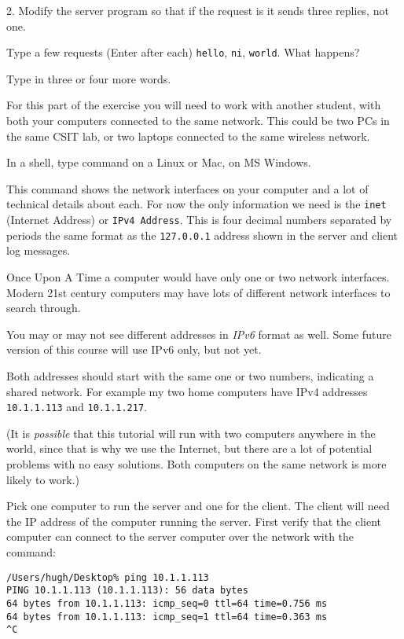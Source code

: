 2. Modify the server program so that if the request is  it sends three replies,
not one.

Type a few requests (Enter after each) \texttt{hello}, \texttt{ni}, \texttt{world}.
What happens?

Type in three or four more words.



For this part of the exercise you will need to work with another student, with both your
computers connected to the same network. This could be two PCs in the same CSIT lab, or
two laptops connected to the same wireless network.

In a shell, type command  on a Linux or Mac,  on MS Windows.

This command shows the network interfaces on your computer and a lot of technical details
about each. For now the only information we need is the \texttt{inet} (Internet Address)
or \texttt{IPv4 Address}. This is four decimal numbers separated by periods \DSH the same
format as the \texttt{127.0.0.1} address shown in the server and client log messages.

\begin{IMPORTANT}
Once Upon A Time a computer would have only one or two network interfaces. Modern 21st
century computers may have lots of different network interfaces to search through.

You may or may not see different addresses in \emph{IPv6} format as well. Some future version
of this course will use IPv6 only, but not yet.
\end{IMPORTANT}

Both addresses should start with the same one or two numbers, indicating a shared network.
For example my two home computers have IPv4 addresses \texttt{10.1.1.113}
and \texttt{10.1.1.217}.

(It is \emph{possible} that this tutorial will run with two computers anywhere in the world,
since that is why we use the Internet, but there are a lot of potential problems
with no easy solutions. Both computers on the same network is more likely to work.)

Pick one computer to run the server and one for the client. The client will need the IP
address of the computer running the server. First verify that the client computer can
connect to the server computer over the network with the  command:

\begin{CODE}\begin{verbatim}
/Users/hugh/Desktop% ping 10.1.1.113
PING 10.1.1.113 (10.1.1.113): 56 data bytes
64 bytes from 10.1.1.113: icmp_seq=0 ttl=64 time=0.756 ms
64 bytes from 10.1.1.113: icmp_seq=1 ttl=64 time=0.363 ms
^C
\end{verbatim}\end{CODE}

